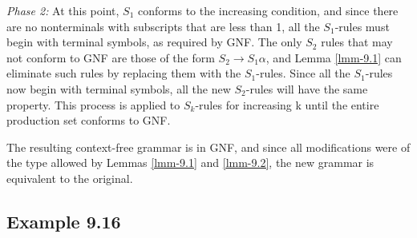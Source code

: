 \begin{thm}
\emph{Phase 2:} At this point, $S_1$ conforms to the increasing condition, and
since there are no nonterminals with subscripts that are less than 1, all the
$S_1$-rules must begin with terminal symbols, as required by GNF. The only $S_2$
rules that may not conform to GNF are those of the form $S_2\rightarrow S_1
\alpha$, and Lemma \ref{lmm-9.1} can eliminate such rules by replacing them with the
$S_1$-rules. Since all the $S_1$-rules now begin with terminal symbols, all the
new $S_2$-rules will have the same property. This process is applied to
$S_k$-rules for increasing k until the entire production set conforms to GNF.

The resulting context-free grammar is in GNF, and since all modifications were
of the type allowed by Lemmas \ref{lmm-9.1} and \ref{lmm-9.2}, the new grammar is equivalent to the
original.
\end{thm}

\subsection*{Example 9.16}

